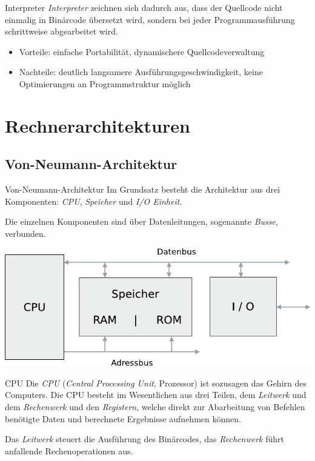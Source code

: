 \documentclass[german]{spicker}
\begin{document}
\begin{defi}{Interpreter}
    \emph{Interpreter} zeichnen sich dadurch aus, dass der Quellcode nicht einmalig in Binärcode übersetzt wird, sondern bei jeder Programmausführung schrittweise abgearbeitet wird.
    \begin{itemize}
        \item Vorteile: einfache Portabilität, dynamischere Quellcodeverwaltung
        \item Nachteile: deutlich langsamere Ausführungsgeschwindigkeit, keine Optimierungen an Programmstruktur möglich
    \end{itemize}
\end{defi}

\section{Rechnerarchitekturen}
\subsection{Von-Neumann-Architektur}

\begin{defi}{Von-Neumann-Architektur}
    Im Grundsatz besteht die Architektur aus drei Komponenten: \emph{CPU}, \emph{Speicher} und \emph{I/O Einheit}.

    Die einzelnen Komponenten sind über Datenleitungen, sogenannte \emph{Busse}, verbunden.
    \begin{center}
        \includegraphics[]{images/von_neumann.pdf}
    \end{center}
\end{defi}

\begin{defi}{CPU}
    Die \emph{CPU} (\emph{Central Processing Unit}, Prozessor) ist sozusagen das Gehirn des Computers.
    Die CPU besteht im Wesentlichen aus drei Teilen, dem \emph{Leitwerk} und
    dem \emph{Rechenwerk} und den \emph{Registern}, welche direkt zur Abarbeitung von Befehlen
    benötigte Daten und berechnete Ergebnisse aufnehmen können.

    Das \emph{Leitwerk} steuert die Ausführung des Binärcodes, das \emph{Rechenwerk} führt anfallende Rechenoperationen aus.
\end{defi}
\end{document}
